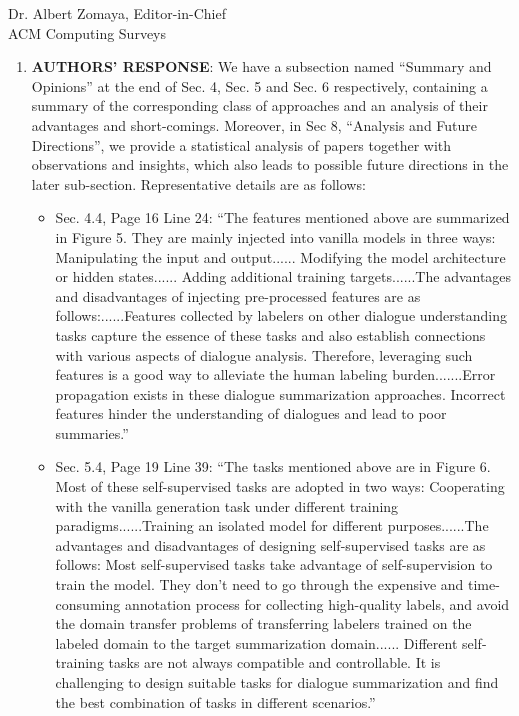 \documentclass[11pt]{letter} %
\begin{document}
\begin{letter}{
Dr. Albert Zomaya, Editor-in-Chief  \\
ACM Computing Surveys}
\begin{enumerate}
	\item[] \textbf{AUTHORS' RESPONSE}: We have a subsection named ``Summary and Opinions'' at the end of Sec. 4, Sec. 5 and Sec. 6 respectively, containing a summary of the corresponding class of approaches and an analysis of their advantages and short-comings. Moreover, in Sec 8, ``Analysis and Future Directions'', we provide a statistical analysis of papers together with observations and insights, which also leads to possible future directions in the later sub-section. Representative details are as follows:
		\begin{itemize}
			\item Sec. 4.4, Page 16 Line 24: ``The features mentioned above are summarized in Figure 5. They are mainly injected into vanilla models in three ways: Manipulating the input and output...... Modifying the model architecture or hidden states...... Adding additional training targets......The advantages and disadvantages of injecting pre-processed features are as follows:......Features collected by labelers on other dialogue understanding tasks capture the essence of these tasks and also establish connections with various aspects of dialogue analysis. Therefore, leveraging such features is a good way to alleviate the human labeling burden.......Error propagation exists in these dialogue summarization approaches. Incorrect features hinder the understanding of dialogues and lead to poor summaries.''
			\item Sec. 5.4, Page 19 Line 39: ``The tasks mentioned above are in Figure 6. Most of these self-supervised tasks are adopted in two ways: Cooperating with the vanilla generation task under different training paradigms......Training an isolated model for different purposes......The advantages and disadvantages of designing self-supervised tasks are as follows: Most self-supervised tasks take advantage of self-supervision to train the model. They don’t need to go through the expensive and time-consuming annotation process for collecting high-quality labels, and avoid the domain transfer problems of transferring labelers trained on the labeled domain to the target summarization domain...... Different self-training tasks are not always compatible and controllable. It is challenging to design suitable tasks for dialogue summarization and find the best combination of tasks in different scenarios.''

\end{itemize}
\end{enumerate}
\end{letter}
\end{document}
